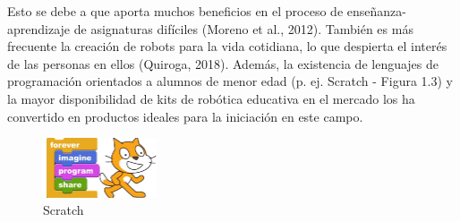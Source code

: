 \documentclass{report}
\begin{document}
Esto se debe a que aporta muchos beneficios en el proceso de enseñanza-aprendizaje de asignaturas difíciles (Moreno et al., 2012). También es más frecuente la creación de robots para la vida cotidiana, lo que despierta el interés de las personas en ellos (Quiroga, 2018). Además, la existencia de lenguajes de programación orientados a alumnos de menor edad (p. ej. Scratch - Figura 1.3) y la mayor disponibilidad de kits de robótica educativa en el mercado los ha convertido en productos ideales para la iniciación en este campo.
\\
\begin{figure}[h!]
  \centering
    \includegraphics[width=0.3\textwidth]{images/logo_scratch.png}
  \caption{Scratch}
  \label{Scratch}
\end{figure}
\\
\end{document}
